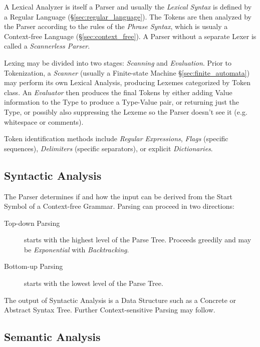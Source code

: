 A Lexical Analyzer is itself a Parser and usually the \emph{Lexical
  Syntax} is defined by a Regular Language
(\S\ref{sec:regular_language}). The Tokens are then analyzed by the
Parser according to the rules of the \emph{Phrase Syntax}, which is
usualy a Context-free Language (\S\ref{sec:context_free}). A Parser
without a separate Lexer is called a \emph{Scannerless Parser}.

Lexing may be divided into two stages: \emph{Scanning} and
\emph{Evaluation}. Prior to Tokenization, a \emph{Scanner} (usually a
Finite-state Machine \S\ref{sec:finite_automata}) may perform its own
Lexical Analysis, producing Lexemes categorized by Token class. An
\emph{Evaluator} then produces the final Tokens by either adding Value
information to the Type to produce a Type-Value pair, or returning
just the Type, or possibly also suppressing the Lexeme so the Parser
doesn't see it (e.g. whitespace or comments).

Token identification methods include \emph{Regular Expressions},
\emph{Flags} (specific sequences), \emph{Delimiters} (specific
separators), or explicit \emph{Dictionaries}.



\subsection{Syntactic Analysis}

The Parser determines if and how the input can be derived from the
Start Symbol of a Context-free Grammar. Parsing can proceed in two
directions:
\begin{description}
    \item [Top-down Parsing] starts with the highest level of the Parse
      Tree. Proceeds greedily and may be \emph{Exponential} with
      \emph{Backtracking}.
    \item [Bottom-up Parsing] starts with the lowest level of the
      Parse Tree.
\end{description}
The output of Syntactic Analysis is a Data Structure such as a
Concrete or Abstract Syntax Tree. Further Context-sensitive Parsing
may follow.



\subsection{Semantic Analysis}\label{sec:semantic_analysis}

